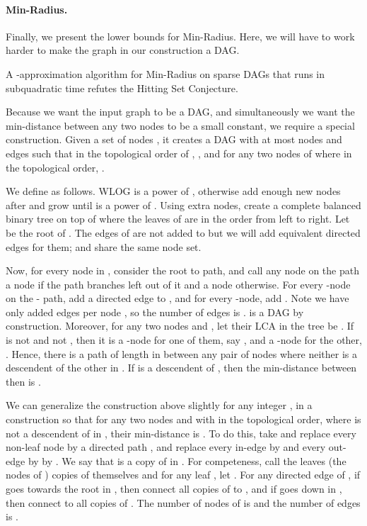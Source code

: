 \paragraph{Min-Radius.} Finally, we present the lower bounds for Min-Radius. Here, we will have to work harder to make the graph in our construction a DAG.

\begin{lemma}
\label{lem:MinRad}
A -approximation algorithm for Min-Radius on sparse DAGs that runs in subquadratic time refutes the Hitting Set Conjecture.
\end{lemma}


Because we want the input graph to be a DAG, and simultaneously we want the min-distance between any two nodes to be a small constant, we require a special construction.
Given a set  of  nodes , it creates a DAG  with at most  nodes and  edges such that in the topological order of , , and for any two nodes of   where  in the topological order, .

We define  as follows. WLOG  is a power of , otherwise add enough  new nodes after  and grow  until  is a power of .
Using  extra nodes, create a complete balanced binary tree  on top of  where the leaves of  are  in the order  from left to right. 
Let  be the root of . The edges of  are not added to  but we will add equivalent directed edges for them;  and  share the same node set. 

Now, for every node  in , consider the root to  path, and call any node  on the path a  node if the path branches left out of it and a  node otherwise. For every -node  on the - path, add a directed edge  to , and for every -node, add . Note we have only added  edges per node , so the number of edges is .  is a DAG by construction. Moreover, for any two nodes  and , let their LCA in the tree be . If  is not  and not , then it is a -node for one of them, say , and a -node for the other, . 
Hence, there is a path of length  in  between any pair of nodes where neither is a descendent of the other in . If  is a descendent of , then the min-distance between then is .

We can generalize the construction above slightly for any integer , in a construction  so that for any two nodes  and  with  in the topological 
order, where  is not a descendent of  in , their min-distance is . To do this, take  and replace every non-leaf node  by a directed path , and replace every in-edge  by  and every out-edge by  by . We say that  is a copy of  in .
For competeness, call the leaves (the nodes of ) copies of themselves and for any leaf , let .
For any directed edge  of , if  goes towards the root in , then connect all copies  of  to , and if  goes down in , then connect  to all copies of . The number of nodes of  is  and the number of edges is .



